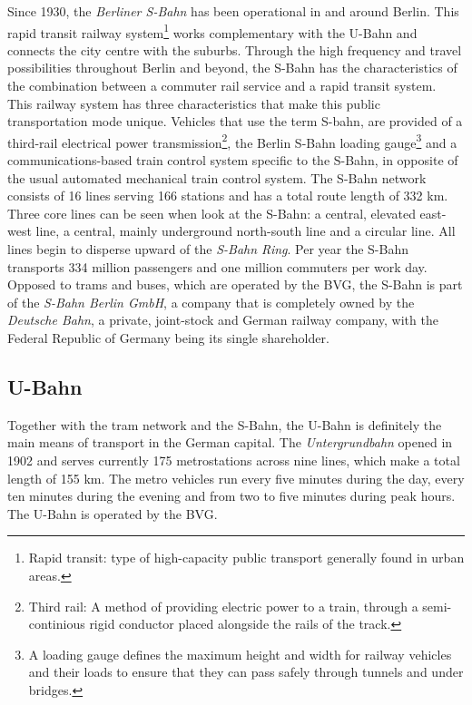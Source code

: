 Since 1930, the \textit{Berliner S-Bahn} has been operational in and around Berlin. This rapid transit railway system\footnote{Rapid transit: type of high-capacity public transport generally found in urban areas.} works complementary with the U-Bahn and connects the city centre with the suburbs. Through the high frequency and travel possibilities throughout Berlin and beyond, the S-Bahn has the characteristics of the combination between a commuter rail service and a rapid transit system. This railway system has three characteristics that make this public transportation mode unique. Vehicles that use the term S-bahn, are provided of a third-rail electrical power transmission\footnote{Third rail: A method of providing electric power to a train, through a semi-continious rigid conductor placed alongside the rails of the track\cite{thirdRail}.}, the Berlin S-Bahn loading gauge\footnote{A loading gauge defines the maximum height and width for railway vehicles and their loads to ensure that they can pass safely through tunnels and under bridges\cite{gauge}.} and a communications-based train control system specific to the S-Bahn, in opposite of the usual automated mechanical train control system. The S-Bahn network consists of 16 lines serving 166 stations and has a total route length of 332 km. Three core lines can be seen when look at the S-Bahn: a central, elevated east-west line, a central, mainly underground north-south line and a circular line. All lines begin to disperse upward of the \textit{S-Bahn Ring}\cite{SBahn}. Per year the S-Bahn transports 334 million passengers and one million commuters per work day\cite{SBahnFIGURES}.\\

Opposed to trams and buses, which are operated by the BVG, the S-Bahn is part of the \textit{S-Bahn Berlin GmbH}, a company that is completely owned by the \textit{Deutsche Bahn}, a private, joint-stock and German railway company, with the Federal Republic of Germany being its single shareholder\cite{DB}.

\subsection{U-Bahn}

Together with the tram network and the S-Bahn, the U-Bahn is definitely the main means of transport in the German capital. The \textit{Untergrundbahn} opened in 1902 and serves currently 175 metrostations across nine lines, which make a total length of 155 km. The metro vehicles run every five minutes during the day, every ten minutes during the evening and from two to five minutes during peak hours. The U-Bahn is operated by the BVG\cite{UBahn}.

